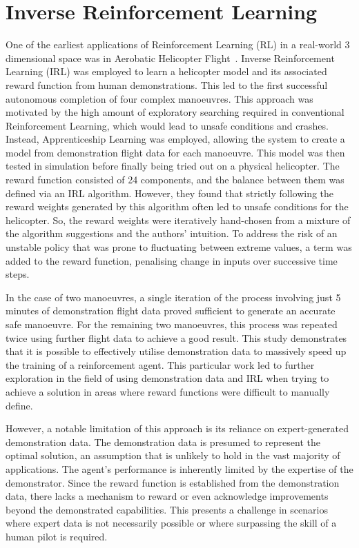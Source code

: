 \section{Inverse Reinforcement Learning}
One of the earliest applications of Reinforcement Learning (RL) in a real-world 3 dimensional space was in Aerobatic Helicopter Flight~\cite{abbeelRLAerobaticFlight}.
Inverse Reinforcement Learning (IRL) was employed to learn a helicopter model and its associated reward function from human demonstrations.
This led to the first successful autonomous completion of four complex manoeuvres.
This approach was motivated by the high amount of exploratory searching required in conventional Reinforcement Learning, which would lead to unsafe conditions and crashes.
Instead, Apprenticeship Learning was employed, allowing the system to create a model from demonstration flight data for each manoeuvre.
This model was then tested in simulation before finally being tried out on a physical helicopter.
The reward function consisted of 24 components, and the balance between them was defined via an IRL algorithm.
However, they found that strictly following the reward weights generated by this algorithm often led to unsafe conditions for the helicopter.
So, the reward weights were iteratively hand-chosen from a mixture of the algorithm suggestions and the authors' intuition. 
To address the risk of an unstable policy that was prone to fluctuating between extreme values, a term was added to the reward function, penalising change in inputs over successive time steps.

In the case of two manoeuvres, a single iteration of the process involving just 5 minutes of demonstration flight data proved sufficient to generate an accurate safe manoeuvre.
For the remaining two manoeuvres, this process was repeated twice using further flight data to achieve a good result.
This study demonstrates that it is possible to effectively utilise demonstration data to massively speed up the training of a reinforcement agent.
This particular work led to further exploration in the field of using demonstration data and IRL when trying to achieve a solution in areas where reward functions were difficult to manually define.

However, a notable limitation of this approach is its reliance on expert-generated demonstration data.
The demonstration data is presumed to represent the optimal solution, an assumption that is unlikely to hold in the vast majority of applications.
The agent's performance is inherently limited by the expertise of the demonstrator.
Since the reward function is established from the demonstration data, there lacks a mechanism to reward or even acknowledge improvements beyond the demonstrated capabilities.
This presents a challenge in scenarios where expert data is not necessarily possible or where surpassing the skill of a human pilot is required. \\\\


